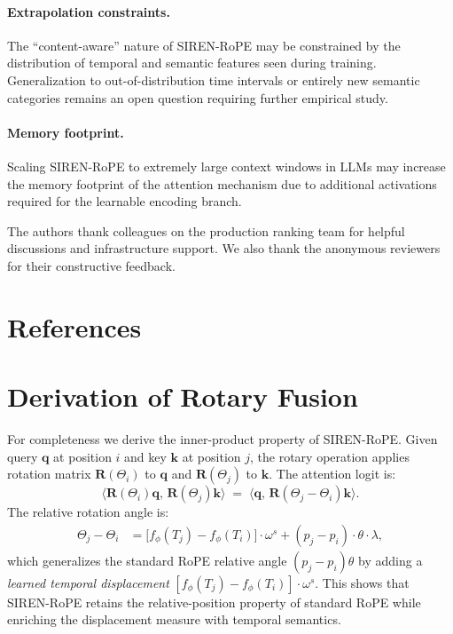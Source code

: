 \documentclass{article}
\begin{document}
\paragraph{Extrapolation constraints.}
The ``content-aware'' nature of SIREN-RoPE may be constrained by the distribution
of temporal and semantic features seen during training. Generalization to
out-of-distribution time intervals or entirely new semantic categories remains an
open question requiring further empirical study.

\paragraph{Memory footprint.}
Scaling SIREN-RoPE to extremely large context windows in LLMs may increase the
memory footprint of the attention mechanism due to additional activations required
for the learnable encoding branch.

\begin{ack}
The authors thank colleagues on the production ranking team for helpful
discussions and infrastructure support. We also thank the anonymous reviewers
for their constructive feedback.
\end{ack}


\section*{References}






\appendix

\section{Derivation of Rotary Fusion}

For completeness we derive the inner-product property of SIREN-RoPE.
Given query $\mathbf{q}$ at position $i$ and key $\mathbf{k}$ at position
$j$, the rotary operation applies rotation matrix $\mathbf{R}(\Theta_i)$ to
$\mathbf{q}$ and $\mathbf{R}(\Theta_j)$ to $\mathbf{k}$. The attention logit is:
\begin{equation}
  \langle \mathbf{R}(\Theta_i)\mathbf{q},\, \mathbf{R}(\Theta_j)\mathbf{k} \rangle
  \;=\;
  \langle \mathbf{q},\, \mathbf{R}(\Theta_j - \Theta_i)\mathbf{k} \rangle.
\end{equation}
The relative rotation angle is:
\begin{align}
  \Theta_j - \Theta_i
  &= \bigl[f_\phi(T_j) - f_\phi(T_i)\bigr] \cdot \omega^s
    + (p_j - p_i) \cdot \theta \cdot \lambda,
\end{align}
which generalizes the standard RoPE relative angle
$(p_j - p_i)\theta$ by adding a \emph{learned temporal displacement}
$[f_\phi(T_j) - f_\phi(T_i)] \cdot \omega^s$. This shows that
SIREN-RoPE retains the relative-position property of standard RoPE while
enriching the displacement measure with temporal semantics.
\end{document}
